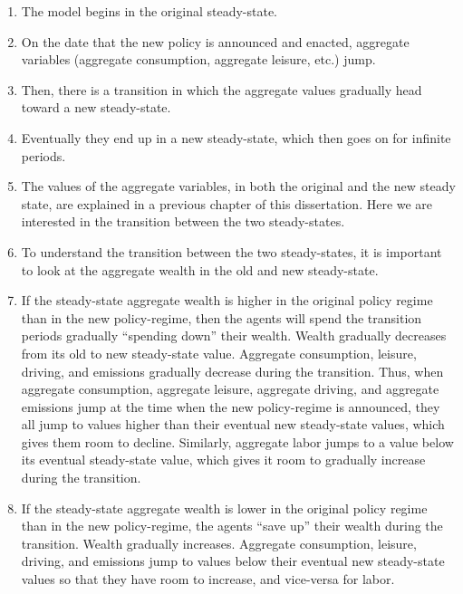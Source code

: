 \documentclass[letter, 12pt, epsf,leqno]{article}
\begin{document}
\begin{enumerate}
\item  The model begins in the original steady-state.  

\item On the date that the new policy is announced and enacted, aggregate variables (aggregate consumption, aggregate leisure, etc.) jump.

\item  Then, there is a transition in which the aggregate values gradually head toward a new steady-state.

\item Eventually they end up in a new steady-state, which then goes on for infinite periods.  

\item The values of the aggregate variables, in both the original and the new steady state, are explained in a previous chapter of this dissertation.  Here we are interested in the transition between the two steady-states.

\item  To understand the transition between the two steady-states, it is important to look at the aggregate wealth in the old and new steady-state.

\item  If the steady-state aggregate wealth is higher in the original policy regime than in the new policy-regime, then the agents will spend the transition periods gradually ``spending down'' their wealth.  Wealth gradually decreases from its old to new steady-state value.  Aggregate consumption, leisure, driving, and emissions gradually decrease during the transition.  Thus, when aggregate consumption, aggregate leisure, aggregate driving, and aggregate emissions jump at the time when the new policy-regime is announced, they all jump to values higher than their eventual new steady-state values, which gives them room to decline.  Similarly, aggregate labor jumps to a value below its eventual steady-state value, which gives it room to gradually increase during the transition.

\item If the steady-state aggregate wealth is lower in the original policy regime than in the new policy-regime, the agents ``save up'' their wealth during the transition.  Wealth gradually increases.  Aggregate consumption, leisure, driving, and emissions jump to values below their eventual new steady-state values so that they have room to increase, and vice-versa for labor.


\end{enumerate}
\end{document}
